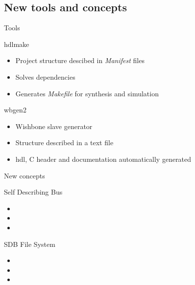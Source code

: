 \documentclass[compress,red]{beamer}
\begin{document}
\subsection{New tools and concepts}

\begin{frame}{Tools}

  \begin{block}{hdlmake}
    \begin{itemize}
    \item
      Project structure descibed in \textit{Manifest} files
    \item
      Solves dependencies
    \item
      Generates \textit{Makefile} for synthesis and simulation
    \end{itemize}
  \end{block}

  \begin{block}{wbgen2}
    \begin{itemize}
    \item
      Wishbone slave generator
    \item
      Structure described in a text file
    \item
      hdl, C header and documentation automatically generated
    \end{itemize}
  \end{block}

\end{frame}

\begin{frame}{New concepts}

  \begin{block}{Self Describing Bus}
    \begin{itemize}
    \item
      
    \item
      
    \item
      
    \end{itemize}
  \end{block}

  \begin{block}{SDB File System}
    \begin{itemize}
    \item
      
    \item
      
    \item
      
    \end{itemize}
  \end{block}

\end{frame}
\end{document}
